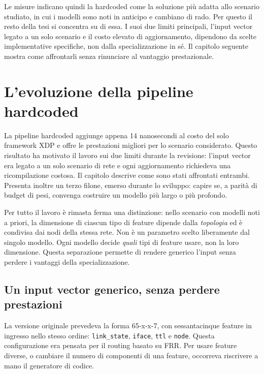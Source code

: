 \documentclass[binding=0.6cm,italian,oneside,noexaminfo]{sapthesis}
\begin{document}
Le misure indicano quindi la hardcoded come la soluzione più adatta allo scenario studiato, in cui i modelli sono noti in anticipo e cambiano di rado. Per questo il resto della tesi si concentra su di essa. I suoi due limiti principali, l'input vector legato a un solo scenario e il costo elevato di aggiornamento, dipendono da scelte implementative specifiche, non dalla specializzazione in sé. Il capitolo seguente mostra come affrontarli senza rinunciare al vantaggio prestazionale.

\chapter{L'evoluzione della pipeline hardcoded}
\label{ch:hardcoded}

La pipeline hardcoded aggiunge appena 14 nanosecondi al costo del solo framework XDP e offre le prestazioni migliori per lo scenario considerato. Questo risultato ha motivato il lavoro sui due limiti durante la revisione: l'input vector era legato a un solo scenario di rete e ogni aggiornamento richiedeva una ricompilazione costosa. Il capitolo descrive come sono stati affrontati entrambi. Presenta inoltre un terzo filone, emerso durante lo sviluppo: capire se, a parità di budget di pesi, convenga costruire un modello più largo o più profondo.

Per tutto il lavoro è rimasta ferma una distinzione: nello scenario con modelli noti a priori, la dimensione di ciascun tipo di feature dipende dalla \emph{topologia} ed è condivisa dai nodi della stessa rete. Non è un parametro scelto liberamente dal singolo modello. Ogni modello decide \emph{quali} tipi di feature usare, non la loro dimensione. Questa separazione permette di rendere generico l'input senza perdere i vantaggi della specializzazione.

\section{Un input vector generico, senza perdere prestazioni}

La versione originale prevedeva la forma 65-x-x-7, con sessantacinque feature in ingresso nello stesso ordine: \texttt{link\_state}, \texttt{iface}, \texttt{ttl} e \texttt{node}. Questa configurazione era pensata per il routing basato su FRR. Per usare feature diverse, o cambiare il numero di componenti di una feature, occorreva riscrivere a mano il generatore di codice.
\end{document}
